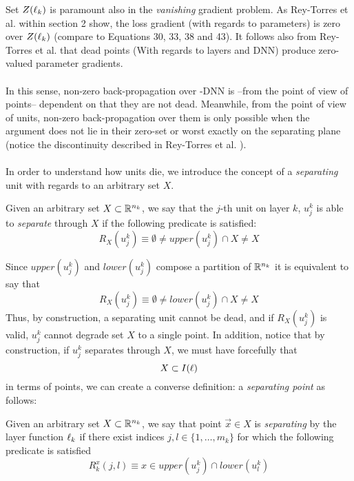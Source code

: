 Set $Z(\ell_k)$ is paramount also in the \emph{vanishing} gradient problem. As Rey-Torres et al. \cite{reyRiera2019ModellingClassificationReLU} within section 2 show, the loss gradient (with regards to parameters) is zero over $Z(\ell_k)$ (compare to Equations 30, 33, 38 and 43). It follows also from Rey-Torres et al.  \cite{reyRiera2019ModellingClassificationReLU} that dead points (With regards to layers and DNN) produce zero-valued parameter gradients. 
\\\\
In this sense, non-zero back-propagation over \ReLU-DNN is --from the point of view of points-- dependent on that they are not dead. Meanwhile, from the point of view of units, non-zero back-propagation over them is only possible when the argument does not lie in their zero-set or worst exactly on the separating plane (notice the discontinuity described in Rey-Torres et al. \cite{reyRiera2019ModellingClassificationReLU}). 
\\\\
In order to understand how units die, we introduce the concept of a \emph{separating} unit with regards to an arbitrary set $X$. 
\begin{definition}\label{def:separatingUnit}
Given an arbitrary set $X\subset\mathbb{R}^{n_k}$, we say that the $j$-th unit on layer $k$, $u_j^k$ is able to \emph{separate} through $X$ if the following predicate is satisfied:
\begin{equation}\label{eq:predicateWithUpper}
    R_X(u_j^k)\equiv \emptyset \neq upper(u_j^k) \cap X \neq X 
\end{equation}
\end{definition}
Since $upper(u_j^k)$ and $lower(u_j^k)$ compose a partition of $\mathbb{R}^{n_k}$ it is equivalent to say that 
\begin{equation}\label{eq:predicateWithLower}
    R_X(u_j^k)\equiv \emptyset \neq lower(u_j^k) \cap X \neq X 
\end{equation}
Thus, by construction, a separating unit cannot be dead, and if $R_X(u_j^k)$ is valid, $u_j^k$ cannot degrade set $X$ to a single point. In addition, notice that by construction, if $u_j^k$ separates through $X$, we must have forcefully that 
\begin{equation}
    X \subset I(\ell)
\end{equation}
in terms of points, we can create a converse definition: a \emph{separating point} as follows:
\begin{definition}\label{def:separatingPoint}
Given an arbitrary set $X\subset\mathbb{R}^{n_k}$, we say that point $\vec{x}\in X$ is \emph{separating} by the layer function $\ell_k$ if there exist indices $j,l\in\{1,\ldots,m_k\}$ for which the following predicate is satisfied
\begin{equation}\label{eq:pointPredicate}
    R^{x}_k(j,l)\equiv x \in upper(u_j^k) \cap  lower(u_l^k)
\end{equation}
\end{definition}
